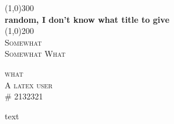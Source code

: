 \documentclass{article} %
\begin{document}
\begin{titlepage}
	\begin{center}
	\line(1,0){300}\\
	[0.25in]
	\huge{\bfseries random, I don't know what title to give}\\
	[2mm]
	\line(1,0){200}\\
	[1.5cm]
	\textsc{\LARGE Somewhat}\\
	\textsc{\Large Somewhat What}\\
	[10cm]
	\end{center}
	\begin{flushright}
	\textsc{\large what\\
	A latex user\\
	\# 2132321\\}
	\end{flushright}
\end{titlepage}
text
\end{document}
